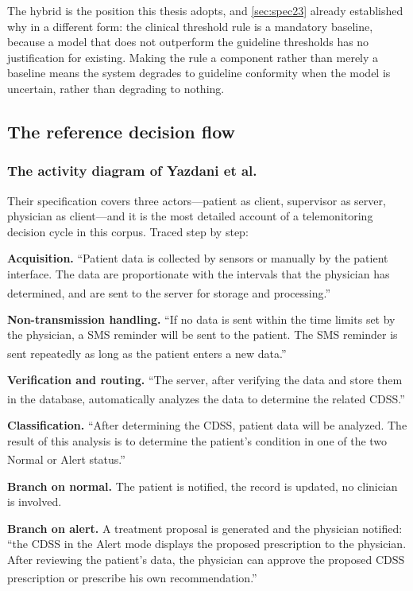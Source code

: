 \documentclass[12pt,a4paper,oneside]{report}
\newcommand{\bq}[1]{``#1''\textsuperscript{\dag}}
\begin{document}
The hybrid is the position this thesis adopts, and \cref{sec:spec23} already established why in a different form: the clinical threshold rule is a mandatory baseline, because a model that does not outperform the guideline thresholds has no justification for existing. Making the rule a component rather than merely a baseline means the system degrades to guideline conformity when the model is uncertain, rather than degrading to nothing.

\subsection{The reference decision flow}\label{sec:decision-flow}

\subsubsection{The activity diagram of Yazdani et al.}

Their specification covers three actors---patient as client, supervisor as server, physician as client---and it is the most detailed account of a telemonitoring decision cycle in this corpus. Traced step by step:

\textbf{Acquisition.} \bq{Patient data is collected by sensors or manually by the patient interface. The data are proportionate with the intervals that the physician has determined, and are sent to the server for storage and processing.}

\textbf{Non-transmission handling.} \bq{If no data is sent within the time limits set by the physician, a SMS reminder will be sent to the patient. The SMS reminder is sent repeatedly as long as the patient enters a new data.}

\textbf{Verification and routing.} \bq{The server, after verifying the data and store them in the database, automatically analyzes the data to determine the related CDSS.}

\textbf{Classification.} \bq{After determining the CDSS, patient data will be analyzed. The result of this analysis is to determine the patient's condition in one of the two Normal or Alert status.}

\textbf{Branch on normal.} The patient is notified, the record is updated, no clinician is involved.

\textbf{Branch on alert.} A treatment proposal is generated and the physician notified: \bq{the CDSS in the Alert mode displays the proposed prescription to the physician. After reviewing the patient's data, the physician can approve the proposed CDSS prescription or prescribe his own recommendation.}
\end{document}
